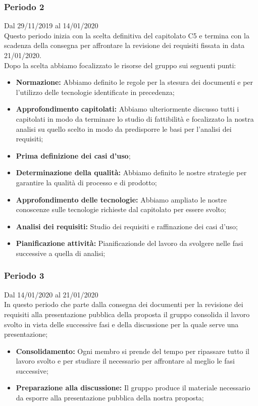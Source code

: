 \subsubsection{Periodo 2} 
Dal 29/11/2019 al 14/01/2020\\
Questo periodo inizia con la scelta definitiva del capitolato C5 e termina con la scadenza della consegna per affrontare la revisione dei requisiti fissata in data 21/01/2020.\\
Dopo la scelta abbiamo focalizzato le risorse del gruppo sui seguenti punti:
\begin{itemize}
	\item \textbf{Normazione: }Abbiamo definito le regole per la stesura dei documenti e per l'utilizzo delle tecnologie identificate in precedenza;
	\item \textbf{Approfondimento capitolati: }Abbiamo ulteriormente discusso tutti i capitolati in modo da terminare lo studio di fattibilità e focalizzato la nostra analisi su quello scelto in modo da predisporre le basi per l'analisi dei requisiti;
	\item \textbf{Prima definizione dei casi d'uso};
	\item \textbf{Determinazione della qualità: }Abbiamo definito le nostre strategie per garantire la qualità di processo e di prodotto;
	\item \textbf{Approfondimento delle tecnologie: }Abbiamo ampliato le nostre conoscenze sulle tecnologie richieste dal capitolato per essere svolto;
	\item \textbf{Analisi dei requisiti: }Studio dei requisiti e raffinazione dei casi d'uso;
	\item \textbf{Pianificazione attività: }Pianificazionde del lavoro da svolgere nelle fasi successive a quella di analisi;
\end{itemize}
\subsubsection{Periodo 3} 
Dal 14/01/2020 al 21/01/2020\\
In questo periodo che parte dalla consegna dei documenti per la revisione dei requisiti alla presentazione pubblica della proposta il gruppo consolida il lavoro svolto in vista delle successive fasi e della discussione per la quale serve una presentazione;
\begin{itemize}
	\item \textbf{Consolidamento:} Ogni membro si prende del tempo per ripassare tutto il lavoro svolto e per studiare il necessario per affrontare al meglio le fasi successive;
	\item \textbf{Preparazione alla discussione:} Il gruppo produce il materiale necessario da esporre alla presentazione pubblica della nostra proposta;
\end{itemize}
